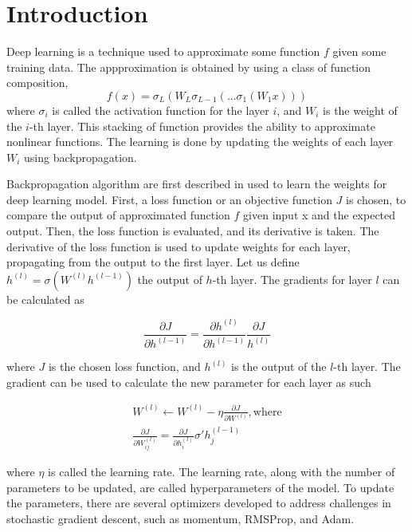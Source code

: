 \section{Introduction}
Deep learning is a technique used to approximate some function $f$ given some training data. The appproximation is obtained by using a class of function composition\cite{LeCun2015},
\begin{equation}
  f(x) = \sigma_L(W_L\sigma_{L-1}(...\sigma_1(W_1x)))
\end{equation}
where $\sigma_i$ is called the activation function for the layer $i$, and $W_i$ is the weight of the $i$-th layer. This stacking of function provides the ability to approximate nonlinear functions\cite{Bengio2021}. The learning is done by updating the weights of each layer $W_i$ using backpropagation.

Backpropagation algorithm are first described in \cite{rumelhart1987learning} used to learn the weights for deep learning model. First, a loss function or an objective function $J$ is chosen, to compare the output of approximated function $f$ given input x and the expected output. Then, the loss function is evaluated, and its derivative is taken. The derivative of the loss function is used to update weights for each layer, propagating from the output to the first layer. Let us define $h^{(l)} = \sigma(W^{(l)}h^{(l-1)})$ the output of $h$-th layer. The gradients for layer $l$ can be calculated as

\begin{equation}
  \frac{\partial J}{\partial h^{(l-1)}} = \frac{\partial h^{(l)}}{\partial h^{(l-1)}} \frac{\partial J}{h^{(l)}}
\end{equation}

where $J$ is the chosen loss function, and $h^{(l)}$ is the output of the $l$-th layer. The gradient can be used to calculate the new parameter for each layer as such

\begin{equation}
  \begin{split}
    W^{(l)} \leftarrow W^{(l)} - \eta \frac{\partial J}{\partial W^{(l)}}\mathrm{, where }\\
    \frac{\partial J}{\partial W^{(l)}_{ij}} = \frac{\partial J}{\partial h^{(l)}_i}\sigma'h_j^{(l-1)}
  \end{split}
\end{equation}

where $\eta$ is called the learning rate. The learning rate, along with the number of parameters to be updated, are called hyperparameters of the model.
To update the parameters, there are several optimizers developed to address challenges in stochastic gradient descent, such as momentum\cite{qian1999momentum}, RMSProp\cite{hinton2012neural}, and Adam\cite{ADAMKingma}.


